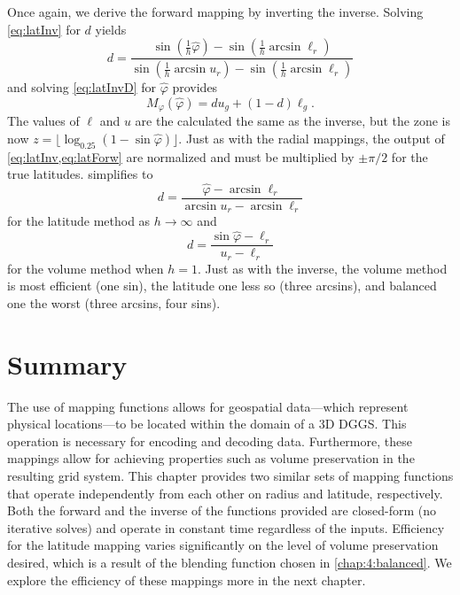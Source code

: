 Once again, we derive the forward mapping by inverting the inverse.
Solving \cref{eq:latInv} for $d$ yields
%
\begin{equation} \label{latForwD}
d = \frac{ \sin \left( \frac{1}{h} \hat{\varphi} \right) - \sin \left( \frac{1}{h} \arcsin \ell_r \right) }{ \sin \left( \frac{1}{h} \arcsin u_r \right) - \sin \left( \frac{1}{h} \arcsin \ell_r \right) }
\end{equation}
%
and solving \cref{eq:latInvD} for $\hat{\varphi}$ provides
%
\begin{equation} \label{eq:latForw}
M_\varphi (\hat{\varphi}) = d u_g + \left( 1 - d \right) \ell_g.
\end{equation}
%
The values of $\ell$ and $u$ are the calculated the same as the inverse, but the zone is now $z = \lfloor \log_{0.25} ( 1 - \sin \hat{\varphi} ) \rfloor$.
Just as with the radial mappings, the output of \cref{eq:latInv,eq:latForw} are normalized and must be multiplied by $\pm \pi / 2$ for the true latitudes.
 simplifies to
%
\begin{equation*}
d = \frac{ \hat{\varphi} - \arcsin \ell_r }{ \arcsin u_r - \arcsin \ell_r}
\end{equation*}
%
for the latitude method as $h \rightarrow \infty$ and
%
\begin{equation*}
d = \frac{ \sin \hat{\varphi} - \ell_r }{ u_r - \ell_r }
\end{equation*}
%
for the volume method when $h = 1$.
Just as with the inverse, the volume method is most efficient (one sin), the latitude one less so (three arcsins), and balanced one the worst (three arcsins, four sins).


\section{Summary}
The use of mapping functions allows for geospatial data---which represent physical locations---to be located within the domain of a 3D DGGS.
This operation is necessary for encoding and decoding data.
Furthermore, these mappings allow for achieving properties such as volume preservation in the resulting grid system.
This chapter provides two similar sets of mapping functions that operate independently from each other on radius and latitude, respectively.
Both the forward and the inverse of the functions provided are closed-form (no iterative solves) and operate in constant time regardless of the inputs.
Efficiency for the latitude mapping varies significantly on the level of volume preservation desired, which is a result of the blending function chosen in \cref{chap:4:balanced}.
We explore the efficiency of these mappings more in the next chapter.
